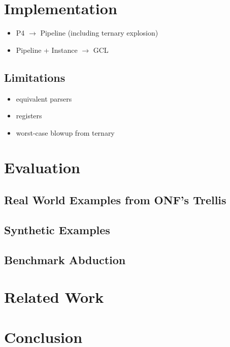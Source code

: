 \section{Implementation}
\begin{itemize}
\item P4 $\to$ Pipeline (including ternary explosion)
\item Pipeline + Instance $\to$  GCL
\end{itemize}

\subsection{Limitations}
\begin{itemize}
\item equivalent parsers
\item registers
\item worst-case blowup from ternary
\end{itemize}

\section{Evaluation}
\subsection{Real World Examples from ONF's Trellis}
\subsection{Synthetic Examples}
\subsection{Benchmark Abduction}

\section{Related Work}
 

\section{Conclusion}


